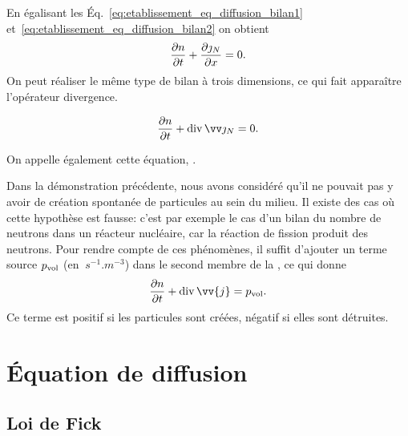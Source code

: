 \documentclass[12pt,fancy]{cours}
\begin{document}
En égalisant les Éq.~\eqref{eq:etablissement_eq_diffusion_bilan1} et~\eqref{eq:etablissement_eq_diffusion_bilan2} on obtient
\begin{equation}
\label{eq:equation_continuite_1D}
\dfrac{\partial n}{\partial t}+\dfrac{\partial \jmath_N}{\partial x}=0.
\end{equation}
On peut réaliser le même type de bilan à trois dimensions, ce qui fait apparaître l’opérateur divergence.

\begin{theorem}\label{form:equation_continuite_3D}
\begin{equation*}
\dfrac{\partial n}{\partial t}+\dive{\Vec{\jN}}=0.
\end{equation*}
\end{theorem}
\noindent On appelle également cette équation, .


\begin{remarque}
Dans la démonstration précédente, nous avons considéré qu'il ne pouvait pas y avoir de création spontanée de particules au sein du milieu. Il existe des cas où cette hypothèse est fausse: c'est par exemple le cas d’un bilan du nombre de neutrons dans un réacteur nucléaire, car la réaction de fission produit des neutrons. Pour rendre compte de ces phénomènes, il suffit d’ajouter un terme source $p_{\rm vol}$ (en $\SI{}{s^{-1}.m^{-3}}$) dans le second membre de la , ce qui donne
\begin{equation}
\dfrac{\partial n}{\partial t}+\dive{\vv{j}}= p_{\rm vol}.
\end{equation}
 Ce terme est positif si les particules sont créées, négatif si elles sont détruites.
 \end{remarque}

\section{Équation de diffusion}

\subsection{Loi de Fick}
\label{sec:fick}
\end{document}
